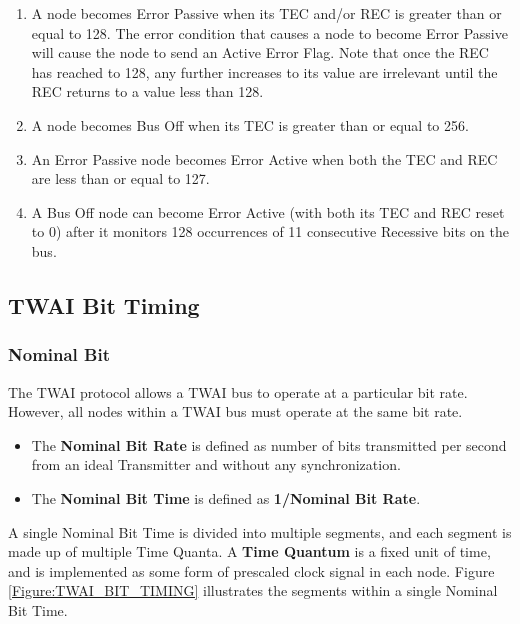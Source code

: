 \documentclass[main\_\_EN.tex]{subfiles}
\begin{document}
\begin{enumerate}
\begin{itemize}
        \item If the REC was between 1 and 127, the REC is decremented by 1.
        \item If the REC was greater than 127, the REC is set to 127.
        \item If the REC was 0, the REC remains 0.
    \end{itemize}
    \item A node becomes Error Passive when its TEC and/or REC is greater than or equal to 128. The error condition that causes a node to become Error Passive will cause the node to send an Active Error Flag. Note that once the REC has reached to 128, any further increases to its value are irrelevant until the REC returns to a value less than 128.
    \item A node becomes Bus Off when its TEC is greater than or equal to 256.
    \item An Error Passive node becomes Error Active when both the TEC and REC are less than or equal to 127.
    \item A Bus Off node can become Error Active (with both its TEC and REC reset to 0) after it monitors 128 occurrences of 11 consecutive Recessive bits on the bus.
\end{enumerate}

\subsection{TWAI Bit Timing}
\subsubsection{Nominal Bit}

The TWAI protocol allows a TWAI bus to operate at a particular bit rate. However, all nodes within a TWAI bus must operate at the same bit rate.

\begin{itemize}
    \item The \textbf{Nominal Bit Rate} is defined as number of bits transmitted per second from an ideal Transmitter and without any synchronization.
    \item The \textbf{Nominal Bit Time} is defined as \textbf{1/Nominal Bit Rate}.
\end{itemize}

A single Nominal Bit Time is divided into multiple segments, and each segment is made up of multiple Time Quanta. A {\bfseries Time Quantum} is a fixed unit of time, and is implemented as some form of prescaled clock signal in each node. Figure \ref{Figure:TWAI_BIT_TIMING} illustrates the segments within a single Nominal Bit Time.
\end{document}
